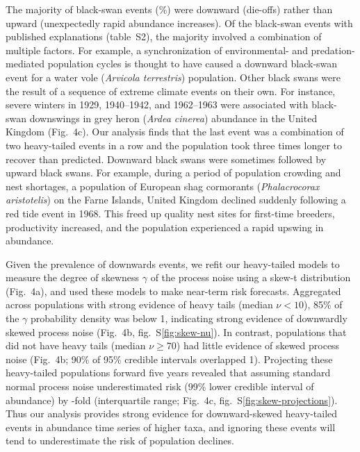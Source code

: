 The majority of black-swan events (\percBSDown \%) were downward (die-offs)
rather than upward (unexpectedly rapid abundance increases). Of the black-swan
events with published explanations (table~S2), the majority involved
a combination of multiple factors. For example, a synchronization of
environmental- and predation-mediated population cycles is thought to have
caused a downward black-swan event for a water vole (\emph{Arvicola
terrestris}) population\cite{saucy1994}. Other black swans were the result of
a sequence of extreme climate events on their own. For instance, severe winters
in 1929, 1940--1942, and 1962--1963 were associated with black-swan downswings
in grey heron (\emph{Ardea cinerea}) abundance in the United
Kingdom\cite{stafford1971} (Fig.~4c). Our analysis finds that the last event
was a combination of two heavy-tailed events in a row and the population took
three times longer to recover than predicted\cite{stafford1971}. Downward black
swans were sometimes followed by upward black swans. For example, during
a period of population crowding and nest shortages, a population of European
shag cormorants (\emph{Phalacrocorax aristotelis}) on the Farne Islands, United
Kingdom declined suddenly following a red tide event in 1968\cite{potts1980}.
This freed up quality nest sites for first-time breeders, productivity
increased, and the population experienced a rapid upswing in
abundance\cite{potts1980}.

Given the prevalence of downwards events, we refit our heavy-tailed models to
measure the degree of skewness \(\gamma\) of the process noise using a skew-t
distribution (Fig.~4a), and used these models to make near-term risk forecasts.
Aggregated across populations with strong evidence of heavy tails (median \(\nu
< 10\)), 85\% of the \(\gamma\) probability density was below 1, indicating
strong evidence of downwardly skewed process noise (Fig.~4b,
fig.~S\ref{fig:skew-nu}). In contrast, populations that did not have heavy
tails (median \(\nu \geq 70\)) had little evidence of skewed process noise
(Fig.~4b; 90\% of 95\% credible intervals overlapped 1). Projecting these
heavy-tailed populations forward five years revealed that assuming standard
normal process noise underestimated risk (99\% lower credible interval of
abundance) by \crashUnderRange-fold (interquartile range; Fig.~4c,
fig.~S\ref{fig:skew-projections}). Thus our analysis provides strong evidence
for downward-skewed heavy-tailed events in abundance time series of higher
taxa, and ignoring these events will tend to underestimate the risk of
population declines.

